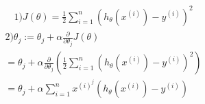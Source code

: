 \begin{answer}
\begin{eqnarray*}
1) J(\theta)=\frac{1}{2}\sum_{i=1}^{n}(h_\theta(x^{(i)})-y^{(i)})^2
\end{eqnarray*}
\begin{eqnarray*}
2) \theta_j:=\theta_j+\alpha\frac{\partial}{\partial\theta_j}J(\theta)\\
=\theta_j+\alpha\frac{\partial}{\partial\theta_j}\left(\frac{1}{2}\sum_{i=1}^{n}(h_\theta(x^{(i)})-y^{(i)})^2\right)\\
=\theta_j+\alpha \sum_{i=1}^{n}x^{(i)^j}(h_\theta(x^{(i)})-y^{(i)})
\end{eqnarray*}
\end{answer}
